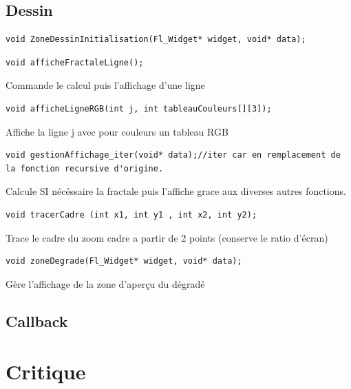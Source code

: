 \documentclass[a4paper,11pt]{article} \usepackage[T1]{fontenc} \usepackage[utf8]{inputenc} \usepackage[francais]{babel}
\begin{document}
\subsection{Dessin}
\begin{lstlisting}
void ZoneDessinInitialisation(Fl_Widget* widget, void* data);\end{lstlisting}
\begin{lstlisting}
void afficheFractaleLigne();\end{lstlisting}
Commande le calcul puis l'affichage d'une ligne
\begin{lstlisting}
void afficheLigneRGB(int j, int tableauCouleurs[][3]);\end{lstlisting}
Affiche la ligne j avec pour couleurs un tableau RGB
\begin{lstlisting}
void gestionAffichage_iter(void* data);//iter car en remplacement de la fonction recursive d'origine.\end{lstlisting}
Calcule SI nécéssaire la fractale puis l'affiche grace aux diverses autres fonctions.
\begin{lstlisting}
void tracerCadre (int x1, int y1 , int x2, int y2);\end{lstlisting}
Trace le cadre du zoom cadre a partir de 2 points (conserve le ratio d'écran)
\begin{lstlisting}
void zoneDegrade(Fl_Widget* widget, void* data);\end{lstlisting}
Gère l'affichage de la zone d’aperçu du dégradé

\subsection{Callback}%



\section{Critique}
\end{document}
